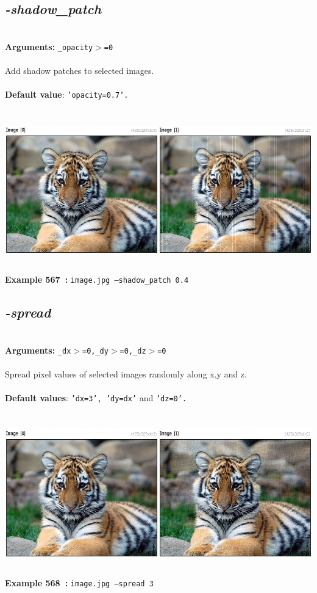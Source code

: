 \documentclass[a4paper,11pt,twoside]{book}
\begin{document}
\subsection{\emph{-shadow\_patch} }\vspace*{-0.5em}
~\\\textbf{Arguments: } 
{\small \texttt{\_opacity$>$=0}}\\~\\
Add shadow patches to selected images.
~\\~\\\textbf{Default value}: {\small \texttt{'opacity=0.7'.}}
\begin{center}\includegraphics[keepaspectratio=true,height=7cm,width=\textwidth]{img/gmic_def567.jpg}\\
{\footnotesize \textbf{Example 567~:} \texttt{image.jpg --shadow\_patch 0.4}}
\end{center}

\subsection{\emph{-spread} }\vspace*{-0.5em}
~\\\textbf{Arguments: } 
{\small \texttt{\_dx$>$=0,\_dy$>$=0,\_dz$>$=0}}\\~\\
Spread pixel values of selected images randomly along x,y and z.
~\\~\\\textbf{Default values}: {\small \texttt{'dx=3', 'dy=dx'} and \texttt{'dz=0'.}}
\begin{center}\includegraphics[keepaspectratio=true,height=7cm,width=\textwidth]{img/gmic_def568.jpg}\\
{\footnotesize \textbf{Example 568~:} \texttt{image.jpg --spread 3}}
\end{center}
\end{document}
